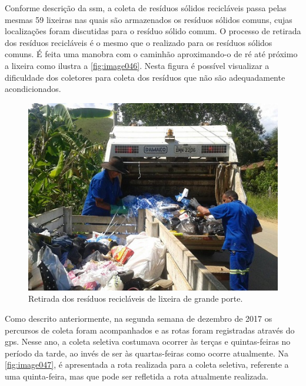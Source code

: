 Conforme descrição da \gls{ssm}, a coleta de resíduos sólidos recicláveis passa pelas mesmas 59 lixeiras nas quais são armazenados os resíduos sólidos comuns, cujas localizações foram discutidas para o resíduo sólido comum.
O processo de retirada dos resíduos recicláveis é o mesmo que o realizado para os resíduos sólidos comuns. É feita uma manobra com o caminhão aproximando-o de ré até próximo a lixeira como ilustra a \autoref{fig:image046}. Nesta figura é possível visualizar a dificuldade dos coletores para coleta dos resíduos que não são adequadamente acondicionados.

\begin{figure}
	\centering
	\includegraphics[width=0.7\linewidth]{produtos/prodtres/image046}
	\caption{Retirada dos resíduos recicláveis de lixeira de grande porte.}
	\label{fig:image046}
\end{figure}


Como descrito anteriormente, na segunda semana de dezembro de 2017 os percursos de coleta foram acompanhados e as rotas foram registradas através do \gls{gps}. Nesse ano, a coleta seletiva costumava ocorrer às terças e quintas-feiras no período da tarde, ao invés de ser às quartas-feiras como ocorre atualmente. Na \autoref{fig:image047}, é apresentada a rota realizada para a coleta seletiva, referente a uma quinta-feira, mas que pode ser refletida a rota atualmente realizada.

